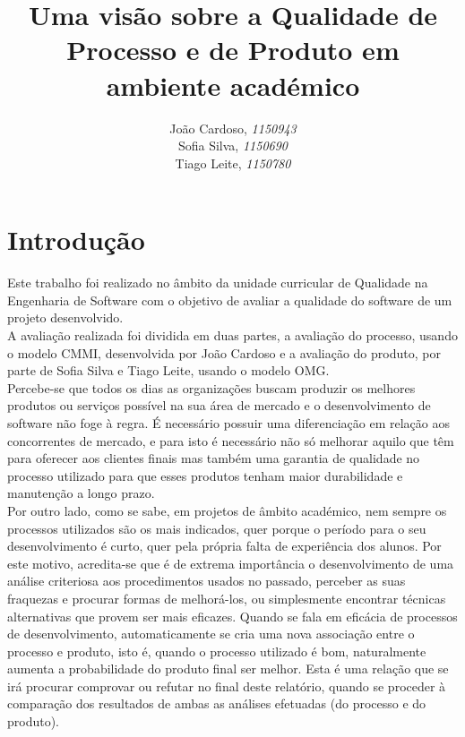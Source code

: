 \documentclass[openany,10pt,a4paper]{article}
\begin{document}

\title{\textbf{Uma visão sobre a Qualidade de Processo e de Produto em ambiente académico}}
\author{João Cardoso, \textit{1150943} \\ Sofia Silva, \textit{1150690} \\ Tiago Leite, \textit{1150780}}
\date{}

\maketitle

\section{Introdução}
Este trabalho foi realizado no âmbito da unidade curricular de Qualidade na Engenharia de Software com o objetivo de avaliar a qualidade do software de um projeto desenvolvido. \\
A avaliação realizada foi dividida em duas partes, a avaliação do processo, usando o modelo CMMI, desenvolvida por João Cardoso e a avaliação do produto, por parte de Sofia Silva e Tiago Leite, usando o modelo OMG.\\
Percebe-se que todos os dias as organizações buscam produzir os melhores produtos ou serviços possível na sua área de mercado e o desenvolvimento de software não foge à regra. É necessário possuir uma diferenciação em relação aos concorrentes de mercado, e para isto é necessário não só melhorar aquilo que têm para oferecer aos clientes finais mas também uma garantia de qualidade no processo utilizado para que esses produtos tenham maior durabilidade e manutenção a longo prazo. \\
Por outro lado, como se sabe, em projetos de âmbito académico, nem sempre os processos utilizados são os mais indicados, quer porque o período para o seu desenvolvimento é curto, quer pela própria falta de experiência dos alunos.
Por este motivo, acredita-se que é de extrema importância o desenvolvimento de uma análise criteriosa aos procedimentos usados no passado, perceber as suas fraquezas e procurar formas de melhorá-los, ou simplesmente encontrar técnicas alternativas que provem ser mais eficazes.
Quando se fala em eficácia de processos de desenvolvimento, automaticamente se cria uma nova associação entre o processo e produto, isto é, quando o processo utilizado é bom, naturalmente aumenta a probabilidade do produto final ser melhor. Esta é uma relação que se irá procurar comprovar ou refutar no final deste relatório, quando se proceder à comparação dos resultados de ambas as análises efetuadas (do processo e do produto).
\end{document}
